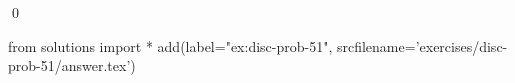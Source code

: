
\begin{ex} 
  \label{ex:disc-prob-51}
  
  \qed
\end{ex} 
\begin{python0}
from solutions import *
add(label="ex:disc-prob-51",
    srcfilename='exercises/disc-prob-51/answer.tex') 
\end{python0}
